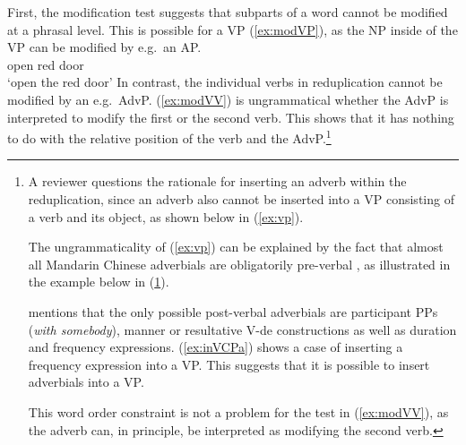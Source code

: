 First, the modification test suggests that subparts of a word cannot be modified at a phrasal level.
This is possible for a VP (\ref{ex:modVP}), as the NP inside of the VP can be modified by e.g.\ an AP.
\ea\label{ex:modVP} %
\gll {}  \\
open  red door\\
\glt `open the red door'
\z
In contrast, the individual verbs in reduplication cannot be modified by an e.g.\ AdvP.
(\ref{ex:modVV}) is ungrammatical whether the AdvP is interpreted to modify the first or the second verb.
This shows that it has nothing to do with the relative position of the verb and the AdvP.\footnote{
A reviewer questions the rationale for inserting an adverb within the reduplication,
since an adverb also cannot be inserted into a VP consisting of a verb and its object, as shown below in (\ref{ex:vp}).

\z

\noindent
The ungrammaticality of (\ref{ex:vp}) can be explained by the fact that almost all Mandarin Chinese adverbials are obligatorily pre-verbal \citep[50]{Ernst2014}, as illustrated in the example below in (\ref{ex:zouadv}).
\ea\label{ex:zouadv}
\z\z

\citet[50]{Ernst2014} mentions that the only possible post-verbal adverbials are participant PPs (\textit{with somebody}),
manner or resultative V-de constructions as well as 
duration and frequency expressions.
(\ref{ex:inVCPa}) shows a case of inserting a frequency expression into a VP.
This suggests that it is possible to insert adverbials into a VP.

This  word order constraint is not a problem for the test in (\ref{ex:modVV}), as the adverb can, in principle, be interpreted as modifying the second verb.
}

\z


